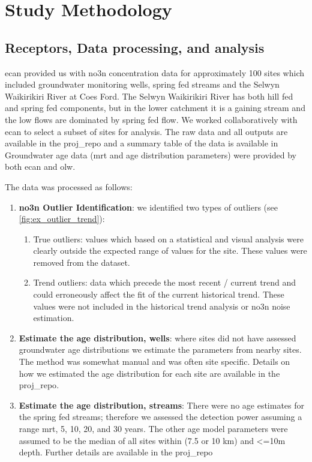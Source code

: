 
\section[Methods]{Study Methodology}   \label{sec:methods}

\subsection[Data]{Receptors, Data processing, and analysis} \label{sec:data}

\gls{ecan} provided us with \gls{no3n} concentration data for approximately 100 sites which included groundwater monitoring wells, spring fed streams and the Selwyn Waikirikiri River at Coes Ford. The Selwyn Waikirikiri River has both hill fed and spring fed components, but in the lower catchment it is a gaining stream and the low flows are dominated by spring fed flow. We worked collaboratively with \gls{ecan} to select a subset of sites for analysis. The raw data and all outputs are available in the \gls{proj_repo} and a summary table of the data is available in  %
Groundwater age data (\gls{mrt} and age distribution parameters) were provided by both \gls{ecan} and \gls{olw}.

The data was processed as follows:
\begin{enumerate}
    \item \textbf{\gls{no3n} Outlier Identification}: we identified two types of outliers (see \autoref{fig:ex_outlier_trend}):
    \begin{enumerate}
        \item  True outliers: values which based on a statistical and visual analysis were clearly outside the expected range of values for the site. These values were removed from the dataset.
        \item Trend outliers: data which precede the most recent / current trend and could erroneously affect the fit of the current historical trend. These values were not included in the historical trend analysis or \gls{no3n} noise estimation.
    \end{enumerate}
    \item \textbf{Estimate the age distribution, wells}: where sites did not have assessed groundwater age distributions we estimate the parameters from nearby sites. The method was somewhat manual and was often site specific. Details on how we estimated the age distribution for each site are available in the \gls{proj_repo}.
    \item \textbf{Estimate the age distribution, streams}: There were no age estimates for the spring fed streams; therefore we assessed the detection power assuming a range \gls{mrt}, 5, 10, 20, and 30 years. The other age model parameters were assumed to be the median of all sites within (7.5 or 10 km) and <=10m depth. Further details are available in the \gls{proj_repo}
\end{enumerate}

